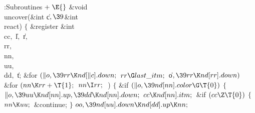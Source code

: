 \Y\B\4:Subroutines\X${}\mathrel+\E{}$\6
\1\1\&{void} \\{uncover}(\&{int} \|c${},\39{}$\&{int} \\{react})\2\2\6
${}\{{}$\1\6
\&{register} \&{int} \\{cc}${},{}$ \|l${},{}$ \|r${},{}$ \\{rr}${},{}$ %
\\{nn}${},{}$ \\{uu}${},{}$ \\{dd}${},{}$ \|t;\7
\&{for} ${}(\|o,\39\\{rr}\K\\{nd}[\|c].\\{down};{}$ ${}\\{rr}\G\\{last%
\_itm};{}$ \|o${},\39\\{rr}\K\\{nd}[\\{rr}].\\{down}){}$\1\6
\&{for} ${}(\\{nn}\K\\{rr}+\T{1};{}$ ${}\\{nn}\I\\{rr};{}$ \,)\5
${}\{{}$\1\6
\&{if} ${}(\|o,\39\\{nd}[\\{nn}].\\{color}\G\T{0}){}$\5
${}\{{}$\1\6
${}\|o,\39\\{uu}\K\\{nd}[\\{nn}].\\{up},\39\\{dd}\K\\{nd}[\\{nn}].\\{down};{}$\6
${}\\{cc}\K\\{nd}[\\{nn}].\\{itm};{}$\6
\&{if} ${}(\\{cc}\Z\T{0}){}$\5
${}\{{}$\1\6
${}\\{nn}\K\\{uu};{}$\6
\&{continue};\6
\4${}\}{}$\2\6
${}\\{oo},\39\\{nd}[\\{uu}].\\{down}\K\\{nd}[\\{dd}].\\{up}\K\\{nn};{}$\6
